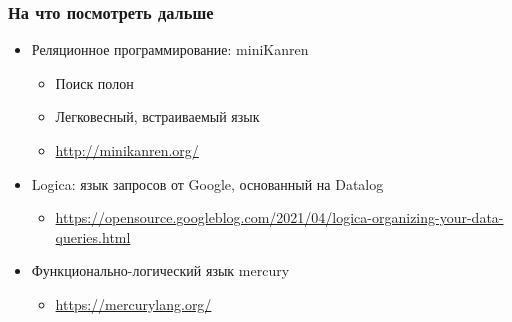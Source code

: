 \documentclass{beamer}
\begin{document}
\begin{frame}[fragile]
  \frametitle{На что посмотреть дальше}
  \begin{itemize}
    \item Реляционное программирование: miniKanren
    \begin{itemize}
      \item Поиск полон
      \item Легковесный, встраиваемый язык
      \item \url{http://minikanren.org/}
    \end{itemize}
    \item Logica: язык запросов от Google, основанный на Datalog
    \begin{itemize}
      \item \url{https://opensource.googleblog.com/2021/04/logica-organizing-your-data-queries.html}
    \end{itemize}
    \item Функционально-логический язык mercury
    \begin{itemize}
      \item \url{https://mercurylang.org/}
    \end{itemize}
  \end{itemize}
\end{frame}








\end{document}
